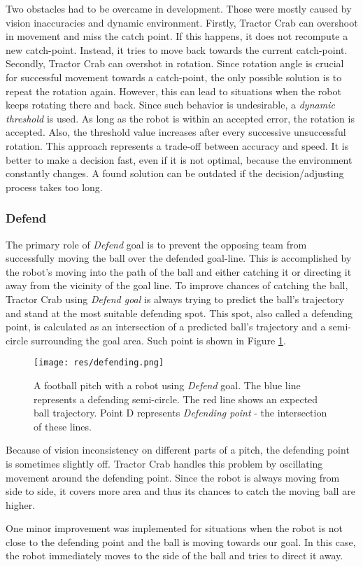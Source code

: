 Two obstacles had to be overcame in development. Those were mostly caused by
vision inaccuracies and dynamic environment. Firstly, Tractor Crab can
overshoot in movement and miss the catch point. If this happens, it does not
recompute a new catch-point. Instead, it tries to move back towards the current
catch-point. Secondly, Tractor Crab can overshot in rotation. Since rotation
angle is crucial for successful movement towards a catch-point, the only
possible solution is to repeat the rotation again. However, this can lead to
situations when the robot keeps rotating there and back. Since such behavior is
undesirable, a \emph{dynamic threshold} is used. As long as the robot is within
an accepted error, the rotation is accepted. Also, the threshold value
increases after every successive unsuccessful rotation. This approach
represents a trade-off between accuracy and speed. It is better to make a
decision fast, even if it is not optimal, because the environment constantly
changes. A found solution can be outdated if the decision/adjusting process
takes too long.

\subsubsection{Defend}

The primary role of \emph{Defend} goal is to prevent the opposing team from successfully moving the ball over the defended goal-line. This is accomplished by the robot's moving into the path of the ball and either catching it or directing it away from the vicinity of the goal line. To improve chances of catching the ball, Tractor Crab using \emph{Defend goal} is always trying to predict the ball's trajectory and stand at the most suitable defending spot. This spot, also called a defending point, is calculated as an intersection of  a predicted ball's trajectory and a semi-circle surrounding the goal area. Such point is shown in Figure \ref{fig:defendingpoint}.

\begin{figure}[H]
	\begin{center}
    \texttt{[image: res/defending.png]}
    \caption{A football pitch with a robot using \emph{Defend} goal. The blue line represents a defending semi-circle. The red line shows an expected ball trajectory. Point D represents \emph{Defending point} - the intersection of these lines.}
    \label{fig:defendingpoint}
	\end{center}
\end{figure}

Because of vision inconsistency on different parts of a pitch, the defending point is sometimes slightly off. Tractor Crab handles this problem by oscillating movement around the defending point. Since the robot is always moving from side to side, it covers more area and thus its chances to catch the moving ball are higher.

One minor improvement was implemented for situations when the robot is not close to the defending point and the ball is moving towards our goal. In this case, the robot immediately moves to the side of the ball and tries to direct it away.
